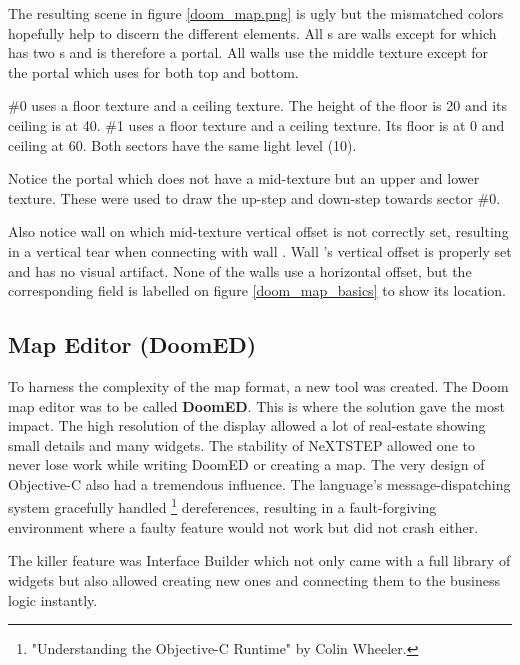 \par

The resulting scene in figure \ref{doom_map.png} is ugly but the mismatched colors hopefully help to discern the different elements. All s are walls except for  which has two s and is therefore a portal. All walls use the  middle texture except for the portal which uses  for both top and bottom.\\
\par
{} \#0 uses a  floor texture and a  ceiling texture. The height of the floor is 20 and its ceiling is at 40.  \#1 uses a  floor texture and a  ceiling texture. Its floor is at 0 and ceiling at 60. Both sectors have the same light level (10).\\
\par
   Notice the portal  which does not have a mid-texture but an upper and lower texture. These were used to draw the up-step and down-step towards sector \#0.\\
\par
Also notice wall  on which mid-texture vertical offset is not correctly set, resulting in a vertical tear when connecting with wall . Wall 's vertical offset is properly set and has no visual artifact. None of the walls use a horizontal offset, but the corresponding field is labelled  on figure \ref{doom_map_basics} to show its location.\\ 
\pagebreak



\subsection{Map Editor (DoomED)}
To harness the complexity of the map format, a new tool was created. The Doom map editor was to be called \textbf{DoomED}. This is where the \NeXT solution gave the most impact. The high resolution of the display allowed a lot of real-estate showing small details and many widgets. The stability of NeXTSTEP allowed one to never lose work while writing DoomED or creating a map.
The very design of Objective-C also had a tremendous influence. The language's message-dispatching system gracefully handled \footnote{"Understanding the Objective-C Runtime" by Colin Wheeler.} dereferences, resulting in a fault-forgiving environment where a faulty feature would not work but did not crash either.\\
\par   
The killer feature was Interface Builder which not only came with a full library of widgets but also allowed creating new ones and connecting them to the business logic instantly.\\
\par
{}
\par


